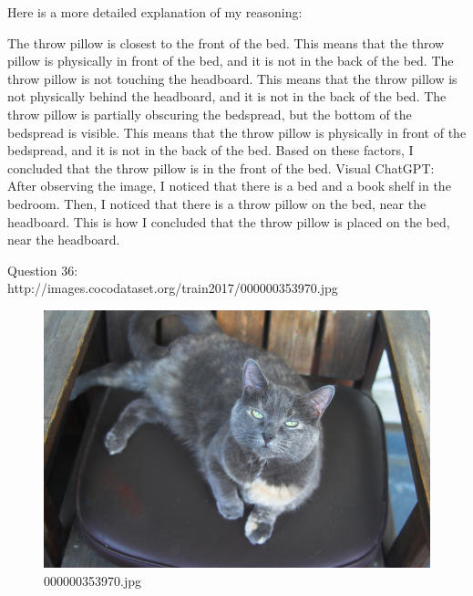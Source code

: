 \begin{enumerate}
        Here is a more detailed explanation of my reasoning:
        
        The throw pillow is closest to the front of the bed. This means that the throw pillow is physically in front of the bed, and it is not in the back of the bed.
        The throw pillow is not touching the headboard. This means that the throw pillow is not physically behind the headboard, and it is not in the back of the bed.
        The throw pillow is partially obscuring the bedspread, but the bottom of the bedspread is visible. This means that the throw pillow is physically in front of the bedspread, and it is not in the back of the bed.
        Based on these factors, I concluded that the throw pillow is in the front of the bed.
        \subitem Visual ChatGPT: After observing the image, I noticed that there is a bed and a book shelf in the bedroom. Then, I noticed that there is a throw pillow on the bed, near the headboard. This is how I concluded that the throw pillow is placed on the bed, near the headboard.
    \end{enumerate}
    Question 36:\\http://images.cocodataset.org/train2017/000000353970.jpg
    \begin{figure}[h]
        \centering
        \includegraphics[width=0.8\linewidth]{../image set/easy/000000353970.jpg}
        \caption{000000353970.jpg}
    \end{figure}

